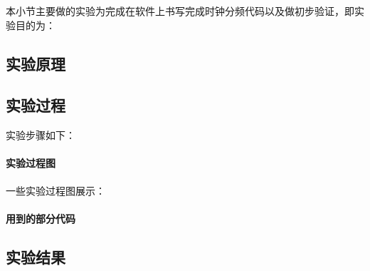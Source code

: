 

本小节主要做的实验为完成在软件上书写完成时钟分频代码以及做初步验证，即实验目的为：

\subsection{实验原理}

\subsection{实验过程}
实验步骤如下：


\paragraph{实验过程图}
一些实验过程图展示：




\paragraph{用到的部分代码}



\subsection{实验结果}
